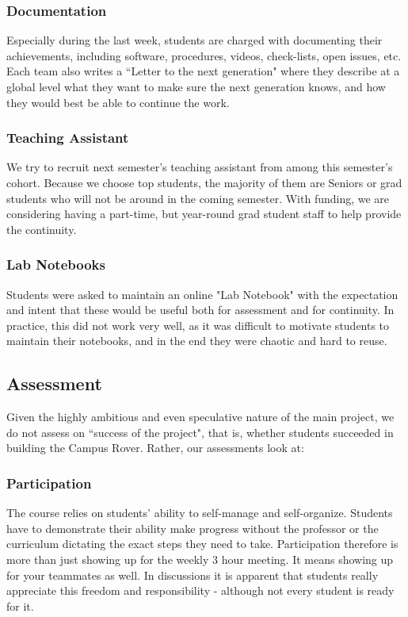 \subsubsection{Documentation}Especially during the last week, students are charged with documenting their achievements, including software, procedures, videos, check-lists, open issues, etc. Each team also writes a ``Letter to the next generation" where they describe at a global level what they want to make sure the next generation knows, and how they would best be able to continue the work.
\subsubsection{Teaching Assistant}We try to recruit next semester’s teaching assistant from among this semester’s cohort. Because we choose top students, the majority of them are Seniors or grad students who will not be around in the coming semester. With funding, we are considering having a part-time, but year-round grad student staff to help provide the continuity.
\subsubsection{Lab Notebooks}Students were asked to maintain an online "Lab Notebook" with the expectation and intent that these would be useful both for assessment and for continuity. In practice, this did not work very well, as it was difficult to motivate students to maintain their notebooks, and in the end they were chaotic and hard to reuse.
\subsection{Assessment} Given the highly ambitious and even speculative nature of the main project, we do not assess on ``success of the project", that is, whether students succeeded in building the Campus Rover. Rather, our assessments look at:

\subsubsection{Participation}
The course relies on students' ability to self-manage and self-organize. Students have to demonstrate their ability make progress without the professor or the curriculum dictating the exact steps they need to take. Participation therefore is more than just showing up for the weekly 3 hour meeting. It means showing up for your teammates as well. In discussions it is apparent that students really appreciate this freedom and responsibility - although not every student is ready for it.

